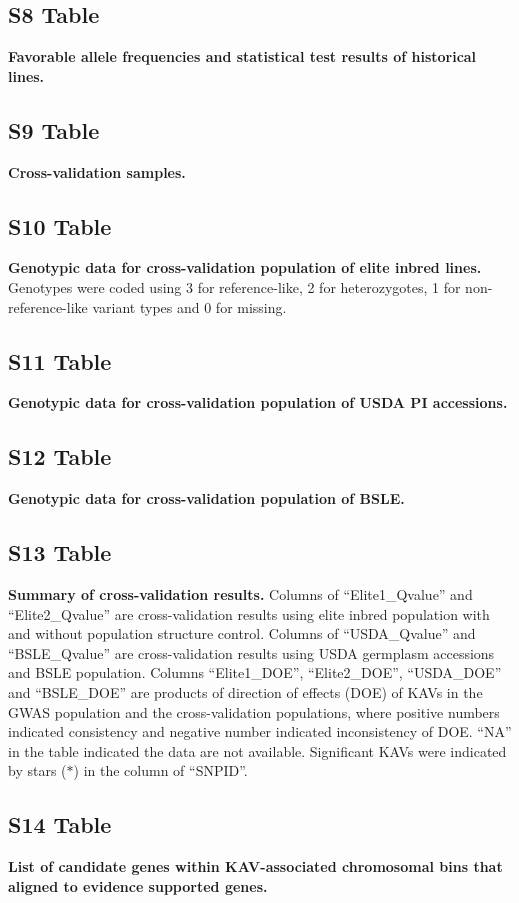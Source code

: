 \documentclass[10pt,letterpaper]{article}
\begin{document}
\subsection*{S8 Table}
\label{Table_S8}
{\bf Favorable allele frequencies and statistical test results of historical lines. }

\subsection*{S9 Table}
\label{Table_S9}
{\bf Cross-validation samples.}

\subsection*{S10 Table}
\label{Table_S10}
{\bf Genotypic data for cross-validation population of elite inbred lines.} Genotypes were coded using 3 for reference-like, 2 for heterozygotes, 1 for non-reference-like variant types and 0 for missing.

\subsection*{S11 Table}
\label{Table_S11}
{\bf Genotypic data for cross-validation population of USDA PI accessions.}

\subsection*{S12 Table}
\label{Table_S12}
{\bf Genotypic data for cross-validation population of BSLE.}

\subsection*{S13 Table}
\label{Table_S13}
{\bf Summary of cross-validation results.} 
Columns of “Elite1\_Qvalue” and “Elite2\_Qvalue” are cross-validation results using elite inbred population with and without population structure control. Columns of “USDA\_Qvalue” and “BSLE\_Qvalue” are cross-validation results using USDA germplasm accessions and BSLE population. Columns “Elite1\_DOE”, “Elite2\_DOE”, “USDA\_DOE” and “BSLE\_DOE” are products of direction of effects (DOE) of KAVs in the GWAS population and the cross-validation populations, where positive numbers indicated consistency and negative number indicated inconsistency of DOE. “NA” in the table indicated the data are not available. Significant KAVs were indicated by stars ($\ast$) in the column of “SNPID”.

\subsection*{S14 Table}
\label{Table_S14}
{\bf List of candidate genes within KAV-associated chromosomal bins that aligned to evidence supported genes.}
\end{document}

